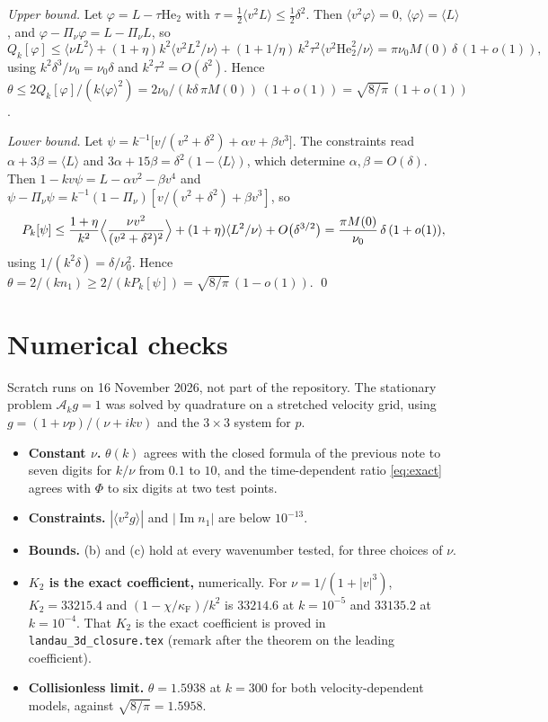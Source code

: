 \documentclass[11pt]{article}
\newcommand{\He}{\mathrm{He}}
\newcommand{\cA}{\mathcal{A}}
\newcommand{\avg}[1]{\langle #1\rangle}
\renewcommand{\Im}{\operatorname{Im}}
\theoremstyle{remark}
\begin{document}
\emph{Upper bound.} Let $\varphi = L-\tau\He_2$ with
$\tau = \tfrac12\avg{v^2L}\le\tfrac12\delta^2$. Then $\avg{v^2\varphi}=0$,
$\avg{\varphi}=\avg{L}$, and $\varphi-\Pi_\nu\varphi = L-\Pi_\nu L$, so
\[
  Q_k[\varphi]\le\avg{\nu L^2} + (1+\eta)k^2\avg{v^2L^2/\nu}
     + (1+1/\eta)\,k^2\tau^2\avg{v^2\He_2^2/\nu}
  = \pi\nu_0M(0)\,\delta\,(1+o(1)),
\]
using $k^2\delta^3/\nu_0 = \nu_0\delta$ and $k^2\tau^2 = O(\delta^2)$. Hence
$\theta\le2Q_k[\varphi]/(k\avg{\varphi}^2)
= 2\nu_0/(k\delta\,\pi M(0))\,(1+o(1)) = \sqrt{8/\pi}\,(1+o(1))$.

\emph{Lower bound.} Let
$\psi = k^{-1}\bigl[v/(v^2+\delta^2) + \alpha v + \beta v^3\bigr]$. The
constraints read $\alpha+3\beta = \avg{L}$ and
$3\alpha+15\beta = \delta^2(1-\avg{L})$, which determine
$\alpha,\beta = O(\delta)$. Then $1-kv\psi = L-\alpha v^2-\beta v^4$ and
$\psi-\Pi_\nu\psi = k^{-1}(1-\Pi_\nu)[v/(v^2+\delta^2)+\beta v^3]$, so
\[
  P_k[\psi]\le\frac{1+\eta}{k^2}
     \Bigl\langle\frac{\nu v^2}{(v^2+\delta^2)^2}\Bigr\rangle
   + (1+\eta)\avg{L^2/\nu} + O\bigl(\delta^{3/2}\bigr)
  = \frac{\pi M(0)}{\nu_0}\,\delta\,(1+o(1)),
\]
using $1/(k^2\delta) = \delta/\nu_0^2$. Hence
$\theta = 2/(kn_1)\ge2/(kP_k[\psi]) = \sqrt{8/\pi}\,(1-o(1))$. \qed

\section{Numerical checks}
\label{sec:num}

Scratch runs on 16 November 2026, not part of the repository. The stationary
problem $\cA_kg=1$ was solved by quadrature on a stretched velocity grid,
using $g = (1+\nu p)/(\nu+ikv)$ and the $3\times3$ system for $p$.
\begin{itemize}
  \item \textbf{Constant $\nu$.} $\theta(k)$ agrees with the closed formula
    of the previous note to seven digits for $k/\nu$ from $0.1$ to $10$, and
    the time-dependent ratio \eqref{eq:exact} agrees with $\Phi$ to six
    digits at two test points.
  \item \textbf{Constraints.} $|\avg{v^2g}|$ and $|\Im n_1|$ are below
    $10^{-13}$.
  \item \textbf{Bounds.} (b) and (c) hold at every wavenumber tested, for
    three choices of $\nu$.
  \item \textbf{$K_2$ is the exact coefficient,} numerically. For
    $\nu = 1/(1+|v|^3)$, $K_2 = 33215.4$ and $(1-\chi/\kappa_{\mathrm F})/k^2$
    is $33214.6$ at $k=10^{-5}$ and $33135.2$ at $k=10^{-4}$. That $K_2$ is
    the exact coefficient is proved in \texttt{landau\_3d\_closure.tex}
    (remark after the theorem on the leading coefficient).
  \item \textbf{Collisionless limit.} $\theta = 1.5938$ at $k=300$ for both
    velocity-dependent models, against $\sqrt{8/\pi} = 1.5958$.
\end{itemize}
\end{document}
